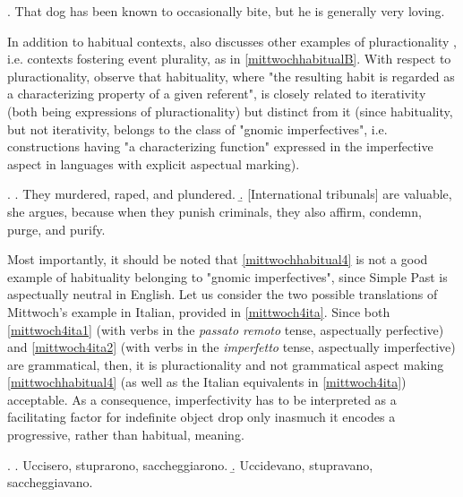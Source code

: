 \ex. \label{goldz} That dog has been known to occasionally bite, but he is generally very loving.  

In addition to habitual contexts, \textcite[248]{Mittwoch2005} also discusses other examples of pluractionality \parencite{lasersohn1995plurality2013}, i.e. contexts fostering event plurality, as in \ref{mittwochhabitualB}. With respect to pluractionality, \textcite{BertinettoLenci2012habituality} observe that habituality, where "the resulting habit is regarded as a characterizing property of a given referent", is closely related to iterativity (both being expressions of pluractionality) but distinct from it (since habituality, but not iterativity, belongs to the class of "gnomic imperfectives", i.e. constructions having "a characterizing function" expressed in the imperfective aspect in languages with explicit aspectual marking).

\ex. \label{mittwochhabitualB} \a. \label{mittwochhabitual4} They murdered, raped, and plundered.
\b. \label{mittwochhabitual5} [International tribunals] are valuable, she argues, because when they punish criminals, they also affirm, condemn, purge, and purify.

Most importantly, it should be noted that \ref{mittwochhabitual4} is not a good example of habituality belonging to "gnomic imperfectives", since Simple Past is aspectually neutral in English. Let us consider the two possible translations of Mittwoch's example in Italian, provided in \ref{mittwoch4ita}. Since both \ref{mittwoch4ita1} (with verbs in the \textit{passato remoto} tense, aspectually perfective) and \ref{mittwoch4ita2} (with verbs in the \textit{imperfetto} tense, aspectually imperfective) are grammatical, then, it is pluractionality and not grammatical aspect making \ref{mittwochhabitual4} (as well as the Italian equivalents in \ref{mittwoch4ita}) acceptable. As a consequence, imperfectivity has to be interpreted as a facilitating factor for indefinite object drop only inasmuch it encodes a progressive, rather than habitual, meaning.

\ex. \label{mittwoch4ita} \a. \label{mittwoch4ita1} Uccisero, stuprarono, saccheggiarono.
\b. \label{mittwoch4ita2} Uccidevano, stupravano, saccheggiavano.


